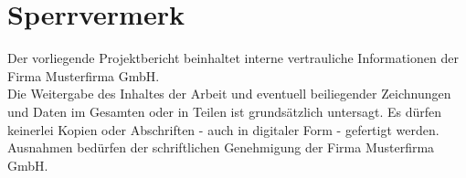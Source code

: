 
\section*{Sperrvermerk}
Der vorliegende Projektbericht beinhaltet interne vertrauliche Informationen der Firma Musterfirma GmbH.\\
Die Weitergabe des Inhaltes der Arbeit und eventuell beiliegender Zeichnungen und Daten im Gesamten oder in Teilen ist grundsätzlich untersagt.
Es dürfen keinerlei Kopien oder Abschriften - auch in digitaler Form - gefertigt werden.
Ausnahmen bedürfen der schriftlichen Genehmigung der Firma Musterfirma GmbH.